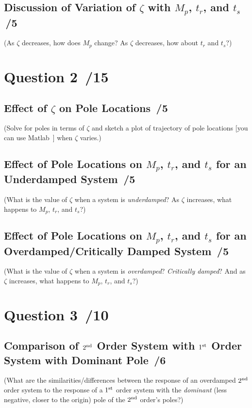 \documentclass{article}
\newcommand{\score}{\hfill \underline{\hspace{0.65cm}}\,/} %
\newcommand\RR{\textsuperscript{\textregistered}~} %
\begin{document}
\subsection*{Discussion of Variation of $\zeta$ with $M_p$, $t_r$, and $t_s$ \score 5}
(As $\zeta$ decreases, how does $M_p$ change? As $\zeta$ decreases, how about $t_r$ and $t_s$?)

\section*{Question 2 \score 15}

\subsection*{Effect of $\zeta$ on Pole Locations \score 5}
(Solve for poles in terms of $\zeta$ and sketch a plot of trajectory of pole locations [you can use {\sc Matlab\RR}] when $\zeta$ varies.)

\subsection*{Effect of Pole Locations on $M_p$, $t_r$, and $t_s$ for an Underdamped System \score 5}
(What is the value of $\zeta$ when a system is \emph{underdamped}? As $\zeta$ increases, what happens to $M_p$, $t_r$, and $t_s$?)

\subsection*{Effect of Pole Locations on $M_p$, $t_r$, and $t_s$ for an Overdamped/Critically Damped System \score 5}
(What is the value of $\zeta$ when a system is \emph{overdamped}? \emph{Critically damped}? And as $\zeta$ increases, what happens to $M_p$, $t_r$, and $t_s$?)

\section*{Question 3 \score 10}

\subsection*{Comparison of $2^{\rm nd}$ Order System with $1^{\rm st}$ Order System with Dominant Pole \score 6}
(What are the similarities/differences between the response of an overdamped $2^{\rm nd}$ order system to the response of a $1^{\rm st}$ order system with the \emph{dominant} (less negative, closer to the origin) pole of the $2^{\rm nd}$ order's poles?)
\end{document}
